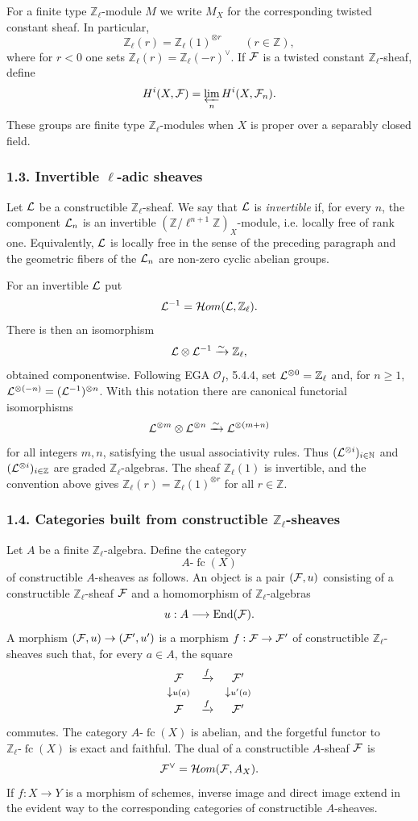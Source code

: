 \documentclass[11pt]{article}
\theoremstyle{plain}
\theoremstyle{definition}
\theoremstyle{remark}
\newcommand{\bN}{\mathbb N}
\newcommand{\bZ}{\mathbb Z}
\DeclareMathOperator{\End}{End}
\providecommand{\fc}{\operatorname{fc}}
\begin{document}
For a finite type $\bZ_\ell$-module $M$ we write $M_X$ for the corresponding twisted
constant sheaf. In particular,
\[
       \bZ_\ell(r)=\bZ_\ell(1)^{\otimes r}\qquad(r\in\bZ),
\]
where for $r<0$ one sets $\bZ_\ell(r)=\bZ_\ell(-r)^{\vee}$. If $\mathcal F$ is a twisted
constant $\bZ_\ell$-sheaf, define
\[
       H^i(X,\mathcal F)=\varprojlim_n H^i(X,\mathcal F_n).
\]
These groups are finite type $\bZ_\ell$-modules when $X$ is proper over a
separably closed field.

\subsubsection*{1.3. Invertible $\ell$-adic sheaves}

Let $\mathcal L$ be a constructible $\bZ_\ell$-sheaf. We say that $\mathcal L$ is \emph{invertible}
if, for every $n$, the component $\mathcal L_n$ is an invertible
$(\bZ/\ell^{n+1}\bZ)_X$-module, i.e. locally free of rank one. Equivalently,
$\mathcal L$ is locally free in the sense of the preceding paragraph and the geometric
fibers of the $\mathcal L_n$ are non-zero cyclic abelian groups.

For an invertible $\mathcal L$ put
\[
      \cL^{-1}=\cH om(\cL,\bZ_\ell).
\]
There is then an isomorphism
\[
      \cL\otimes\cL^{-1}\xrightarrow{\sim}\bZ_\ell,
\]
obtained componentwise. Following EGA $\mathcal O_I$, 5.4.4, set
$\cL^{\otimes0}=\bZ_\ell$ and, for $n\ge1$,
$\mathcal L^{\otimes(-n)}=(\mathcal L^{-1})^{\otimes n}$. With this notation there are canonical
functorial isomorphisms
\[
      \mathcal L^{\otimes m}\otimes\mathcal L^{\otimes n}\xrightarrow{\sim}
      \mathcal L^{\otimes(m+n)}
\]
for all integers $m,n$, satisfying the usual associativity rules. Thus
$(\cL^{\otimes i})_{i\in\bN}$ and $(\cL^{\otimes i})_{i\in\bZ}$ are graded
$\bZ_\ell$-algebras. The sheaf $\bZ_\ell(1)$ is invertible, and the convention above
gives $\bZ_\ell(r)=\bZ_\ell(1)^{\otimes r}$ for all $r\in\bZ$.

\subsubsection*{1.4. Categories built from constructible $\bZ_\ell$-sheaves}

Let $A$ be a finite $\bZ_\ell$-algebra. Define the category
\[
       A\text{-}\fc(X)
\]
of constructible $A$-sheaves as follows. An object is a pair $(\mathcal F,u)$ consisting of
a constructible $\bZ_\ell$-sheaf $\mathcal F$ and a homomorphism of $\bZ_\ell$-algebras
\[
       u:A\longrightarrow \End(\cF).
\]
A morphism $(\mathcal F,u)\to(\mathcal F',u')$ is a morphism $f:\mathcal F\to\mathcal F'$ of constructible
$\bZ_\ell$-sheaves such that, for every $a\in A$, the square
\[
\begin{array}{ccc}
\mathcal F&\xrightarrow{f}&\mathcal F'\\
\downarrow\scriptstyle u(a)&&\downarrow\scriptstyle u'(a)\\
\mathcal F&\xrightarrow{f}&\mathcal F'
\end{array}
\]
commutes. The category $A\text{-}\fc(X)$ is abelian, and the forgetful functor to
$\bZ_\ell\text{-}\fc(X)$ is exact and faithful. The dual of a constructible
$A$-sheaf $\mathcal F$ is
\[
       \mathcal F^\vee=\mathcal H om(\mathcal F,A_X).
\]
If $f:X\to Y$ is a morphism of schemes, inverse image and direct image extend in
the evident way to the corresponding categories of constructible $A$-sheaves.
\end{document}
